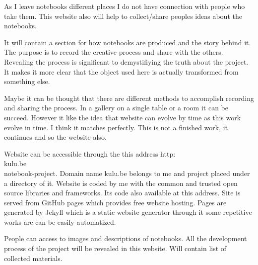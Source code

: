 As I leave notebooks different places I do not have connection with people who take them. This website also will help to collect/share peoples ideas about the notebooks.

It will contain a section for how notebooks are produced and the story behind it. The purpose is to record the creative process and share with the others. Revealing the process is significant to demystifiying the truth about the project. It makes it more clear that the object used here is actually transformed from something else.

Maybe it can be thought that there are different methods to accomplish recording and sharing the process. In a gallery on a single table or a room it can be succeed. However it like the idea that website can evolve by time as this work evolve in time. I think it matches perfectly. This is not a finished work, it continues and so the website also.



Website can be accessible through the this address http:\\kulu.be\\notebook-project. Domain name kulu.be belongs to me and project placed under a directory of it. Website is coded by me with the common and trusted open source libraries and frameworks. Its code also available at this address. Site is served from GitHub pages which provides free website hosting. Pages are generated by Jekyll which is a static website generator through it some repetitive works are can be easily automatized. 

People can access to images and descriptions of notebooks. All the development process of the project will be revealed in this website. Will contain list of collected materials. 

